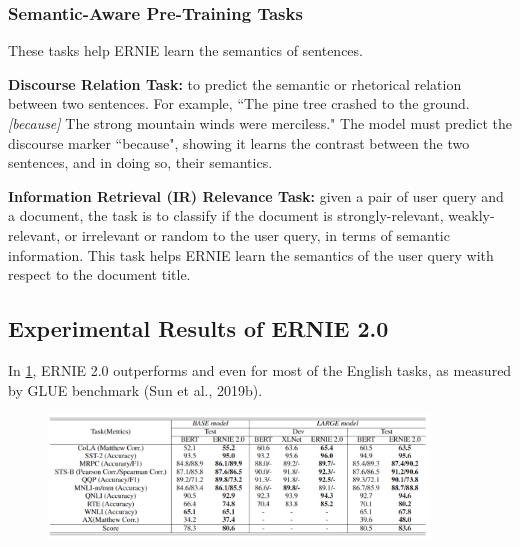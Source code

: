\subsubsection{Semantic-Aware Pre-Training Tasks}\label{sec:SemanticAwarePretrainingTask}

These tasks help ERNIE learn the semantics of sentences. 

\begin{itemizeSpaced}{4pt}

    \item \textbf{Discourse Relation Task: }to predict the semantic or rhetorical relation between two sentences. For example, ``The pine tree crashed to the ground. \textit{[because]} The strong mountain winds were merciless." The model must predict the discourse marker ``because", showing it learns the contrast between the two sentences, and in doing so, their semantics. 
    
    \item \textbf{Information Retrieval (IR) Relevance Task: }given a pair of user query and a document, the task is to classify if the document is strongly-relevant, weakly-relevant, or irrelevant or random to the user query, in terms of semantic information. This task helps ERNIE learn the semantics of the user query with respect to the document title. 
    
\end{itemizeSpaced}



\subsection{Experimental Results of ERNIE 2.0}\label{sec:ExperimentalResultsERNIE2}

In \cref{tbl:ernie2_bert_xlnet_expresults}, ERNIE 2.0 outperforms  and even  for most of the English tasks, as measured by GLUE benchmark (Sun et al., 2019b). 

\begin{figure}[h]
\vspace{-5pt}
\centering
\includegraphics[width=0.9\textwidth]{imgs/ernie2_tableBERTvsERNIE2vsXLNET.png}
\vspace{-5pt}
\vspace{-5pt}
\label{tbl:ernie2_bert_xlnet_expresults}
\end{figure}

